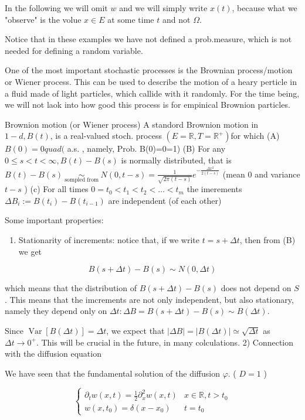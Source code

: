 In the following we will omit $w$ and we will simply write $x(t)$, because what we "observe" is the volue $x \in E$ at some time $t$ and not $\Omega$.

Notice that in these examples we have not defined a prob.measure, which is not needed for defining a random variable.

One of the most important stochastic processes is the Brownian process/motion or Wiener process.
This can be used to describe the motion of a heary perticle in a fluid made of light particles, which callide with it randomly. For the time being, we will not laok into how good this process is for empinical Brownion particles.

Brownion motion (or Wiener process)
A standord Brownion motion in $1-d, B(t)$, is a real-valued stoch. process $\left(E=\mathbb{R}, T=\mathbb{R}^{+}\right)$for which
(A) $B(0)=0 
quad ($ a.s. , namely, Prob. {B(0)=0}=1)
(B) For any $0 \leqslant s<t<\infty, B(t)-B(s)$ is normally distributed, that is $B(t)-B(s) \underset{\text { sompled from }}{\sim} N(0, t-s)=\frac{1}{\sqrt{2 \pi(t-s)}} e^{-\frac{\Delta x^{2}}{2(t-s)}}$ (mean 0 and variance $t-s$ )
(c) For all times $0=t_{0}<t_{1}<t_{2}<\ldots<t_{m}$ the imerements $\Delta B_{i}:=B\left(t_{i}\right)-B\left(t_{i-1}\right)$ are independent (of each other)

Some important properties:

\begin{enumerate}
  \item Stationarity of increments: notice that, if we write $t=s+\Delta t$, then from (B) we get
\end{enumerate}

$$ B(s+\Delta t)-B(s) \sim N(0, \Delta t) $$

which means that the distribution of $B(s+\Delta t)-B(s)$ does not depend on $S$. This means that the imcrements are not only independent, but also stationary, namely they depend only on $\Delta t: \Delta B=B(s+\Delta t)-B(s) \sim B(\Delta t)$.

Since $\operatorname{Var}[B(\Delta t)]=\Delta t$, we expect that $|
\Delta B|=|B(\Delta t)| \simeq \sqrt{\Delta t}$ as $\Delta t \rightarrow 0^{+}$. This will be crucial in the future, in many colculations.
2) Connection with the diffusion equation

We have seen that the fundamental solution of the diffusion $\varphi$. ( $D=1$ )

$$ \left\{\begin{array}{cc}
\partial_{t} w(x, t)=\frac{1}{2} \partial_{x}^{2} w(x, t) & x \in \mathbb{R}, t>t_{0} \\
w(x, t_{0})=\delta\left(x-x_{0}\right) & t=t_{0}
\end{array}\right. $$

